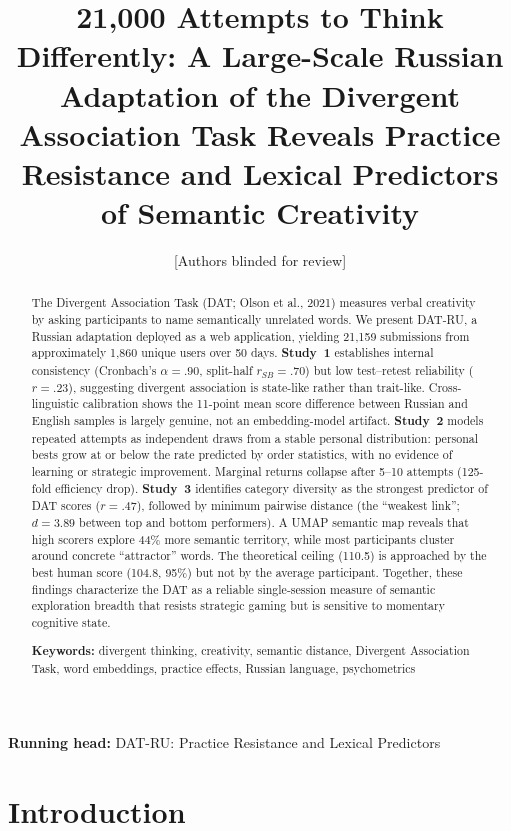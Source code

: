 \documentclass[12pt]{article}
\title{21,000 Attempts to Think Differently: A Large-Scale Russian Adaptation of the Divergent Association Task Reveals Practice Resistance and Lexical Predictors of Semantic Creativity}
\author{[Authors blinded for review]}
\date{}
\begin{document}
\maketitle

\noindent\textbf{Running head:} DAT-RU: Practice Resistance and Lexical Predictors

\begin{abstract}
The Divergent Association Task (DAT; Olson et al., 2021) measures verbal creativity by asking participants to name semantically unrelated words. We present DAT-RU, a Russian adaptation deployed as a web application, yielding 21,159 submissions from approximately 1,860 unique users over 50 days. \textbf{Study~1} establishes internal consistency (Cronbach's $\alpha = .90$, split-half $r_{SB} = .70$) but low test--retest reliability ($r = .23$), suggesting divergent association is state-like rather than trait-like. Cross-linguistic calibration shows the 11-point mean score difference between Russian and English samples is largely genuine, not an embedding-model artifact. \textbf{Study~2} models repeated attempts as independent draws from a stable personal distribution: personal bests grow at or below the rate predicted by order statistics, with no evidence of learning or strategic improvement. Marginal returns collapse after 5--10 attempts (125-fold efficiency drop). \textbf{Study~3} identifies category diversity as the strongest predictor of DAT scores ($r = .47$), followed by minimum pairwise distance (the ``weakest link''; $d = 3.89$ between top and bottom performers). A UMAP semantic map reveals that high scorers explore 44\% more semantic territory, while most participants cluster around concrete ``attractor'' words. The theoretical ceiling (110.5) is approached by the best human score (104.8, 95\%) but not by the average participant. Together, these findings characterize the DAT as a reliable single-session measure of semantic exploration breadth that resists strategic gaming but is sensitive to momentary cognitive state.

\medskip
\noindent\textbf{Keywords:} divergent thinking, creativity, semantic distance, Divergent Association Task, word embeddings, practice effects, Russian language, psychometrics
\end{abstract}

\clearpage

\section{Introduction}
\end{document}
